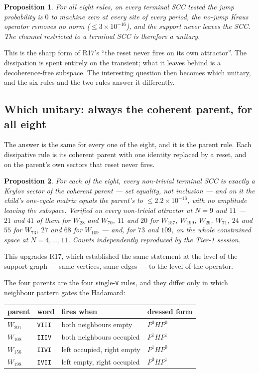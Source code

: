 \documentclass[11pt]{article}
\newcommand{\rt}[1]{\texttt{#1}}
\theoremstyle{plain}
\newtheorem{proposition}{Proposition}
\begin{document}
\begin{proposition}
For all eight rules, on every terminal SCC tested the jump probability is $0$ to
machine zero at every site of every period, the no-jump Kraus operator removes no
norm ($\le 3\times10^{-16}$), and the support never leaves the SCC. The channel
restricted to a terminal SCC is therefore a \emph{unitary}.
\end{proposition}

\noindent This is the sharp form of R17's ``the reset never fires on its own
attractor''. The dissipation is spent entirely on the transient; what it leaves
behind is a decoherence-free subspace. The interesting question then becomes
which unitary, and the six rules and the two rules answer it differently.

\subsection{Which unitary: always the coherent parent, for all eight}
\label{sec:parentall}

The answer is the same for every one of the eight, and it is the parent rule.
Each dissipative rule is its coherent parent with one identity replaced by a
reset, and on the parent's own sectors that reset never fires.

\begin{proposition}
For each of the eight, every non-trivial terminal SCC is \emph{exactly} a Krylov
sector of the coherent parent --- set equality, not inclusion --- and on it the
child's one-cycle matrix equals the parent's to $\le2.2\times10^{-16}$, with no
amplitude leaving the subspace. Verified on \emph{every} non-trivial attractor at
$N=9$ and $11$ --- $21$ and $41$ of them for $W_{28}$ and $W_{70}$, $11$ and $20$
for $W_{157}$, $W_{199}$, $W_{29}$, $W_{71}$, $24$ and $55$ for $W_{73}$, $27$
and $68$ for $W_{109}$ --- and, for $73$ and $109$, on the whole constrained
space at $N=4,\dots,11$. Counts independently reproduced by the Tier-1 session.
\end{proposition}

\noindent This upgrades R17, which established the same statement at the level of
the support graph --- same vertices, same edges --- to the level of the operator.

The four parents are the four single-\rt{V} rules, and they differ only in which
neighbour pattern gates the Hadamard:
\begin{center}
\begin{tabular}{llll}
\toprule
parent & word & fires when & dressed form \\
\midrule
$W_{201}$ & \rt{VIII} & both neighbours empty & $P^0HP^0$ \\
$W_{108}$ & \rt{IIIV} & both neighbours occupied & $P^1HP^1$ \\
$W_{156}$ & \rt{IIVI} & left occupied, right empty & $P^1HP^0$ \\
$W_{198}$ & \rt{IVII} & left empty, right occupied & $P^0HP^1$ \\
\bottomrule
\end{tabular}
\end{center}
\end{document}
